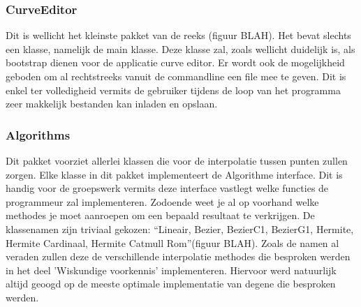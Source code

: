 \documentclass[a4paper,11pt,oneside, titlepage]{article}
\begin{document}
\subsubsection{CurveEditor}
Dit is wellicht het kleinste pakket van de reeks (figuur BLAH). Het bevat slechts een klasse, 
namelijk de 
main klasse. Deze klasse zal, zoals wellicht duidelijk is, als bootstrap dienen voor de 
applicatie curve editor. Er wordt ook de mogelijkheid geboden om al rechtstreeks vanuit
de commandline een file mee te geven. Dit is enkel ter volledigheid vermits de gebruiker tijdens
de loop van het programma zeer makkelijk bestanden kan inladen en opslaan.
\subsubsection{Algorithms}
Dit pakket voorziet allerlei klassen die voor de interpolatie tussen punten zullen zorgen.
Elke klasse in dit pakket implementeert de Algorithme interface. Dit is handig voor de 
groepswerk vermits deze interface vastlegt welke functies de programmeur zal implementeren.
Zodoende weet je al op voorhand welke methodes je moet aanroepen om een bepaald resultaat
te verkrijgen. \newline
De klassenamen zijn triviaal gekozen: ``Lineair, Bezier, BezierC1, BezierG1, Hermite, 
Hermite Cardinaal, Hermite Catmull Rom''(figuur BLAH). 
Zoals de namen al veraden zullen deze de verschillende
interpolatie methodes die besproken werden in het deel 'Wiskundige voorkennis' implementeren.
Hiervoor werd natuurlijk altijd geoogd op de meeste optimale implementatie van degene die 
besproken werden.
\end{document}
